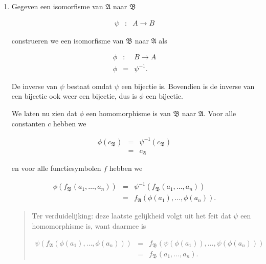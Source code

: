 \documentclass[a4paper,11pt]{article}
\begin{document}
\begin{enumerate}
\item %

Gegeven een isomorfisme van $\mathfrak{A}$ naar $\mathfrak{B}$

\begin{eqnarray*}
\psi & : & A \rightarrow B
\end{eqnarray*}

construeren we een isomorfisme van $\mathfrak{B}$ naar $\mathfrak{A}$ als

\begin{eqnarray*}
\phi & : & B \rightarrow A \\
\phi & = & \psi^{-1}.
\end{eqnarray*}

De inverse van $\psi$ bestaat omdat $\psi$ een bijectie is. Bovendien is de
inverse van een bijectie ook weer een bijectie, dus is $\phi$ een bijectie.

We laten nu zien dat $\phi$ een homomorphisme is van $\mathfrak{B}$ naar
$\mathfrak{A}$. Voor alle constanten $c$ hebben we

\begin{eqnarray*}
\phi(c_{\mathfrak{B}}) & = & \psi^{-1}(c_{\mathfrak{B}}) \\
                       & = & c_{\mathfrak{A}}
\end{eqnarray*}

en voor alle functiesymbolen $f$ hebben we

\begin{eqnarray*}
\phi(f_{\mathfrak{B}}(a_{1}, \ldots, a_{n})) & = & \psi^{-1}(f_{\mathfrak{B}}(a_{1}, \ldots, a_{n})) \\
                                             & = &
                                             f_{\mathfrak{A}}(\phi(a_{1}),
                                             \ldots, \phi(a_{n})).
\end{eqnarray*}

\begin{quote}
Ter verduidelijking: deze laatste gelijkheid volgt uit het feit dat $\psi$ een
homomorphisme is, want daarmee is

\begin{eqnarray*}
\psi(f_{\mathfrak{A}}(\phi(a_{1}), \ldots, \phi(a_{n}))) & = & f_{\mathfrak{B}}(\psi(\phi(a_{1})), \ldots, \psi(\phi(a_{n}))) \\
                                                         & = & f_{\mathfrak{B}}(a_{1}, \ldots, a_{n}).
\end{eqnarray*}
\end{quote}


\end{enumerate}
\end{document}
